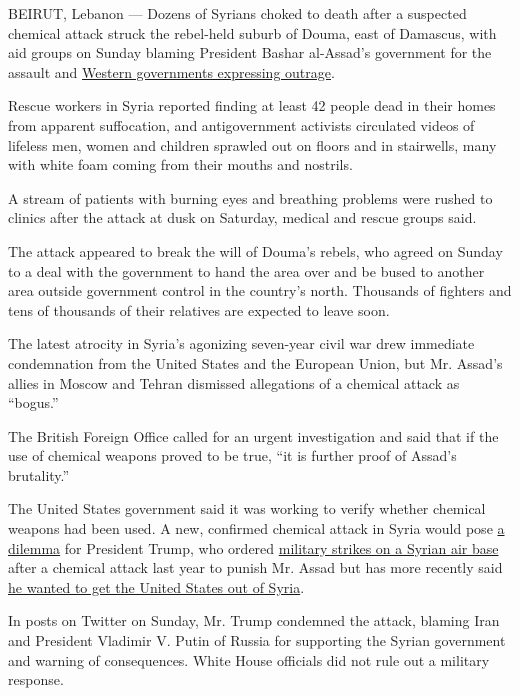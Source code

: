 BEIRUT, Lebanon --- Dozens of Syrians choked to death after a suspected
chemical attack struck the rebel-held suburb of Douma, east of Damascus,
with aid groups on Sunday blaming President Bashar al-Assad's government
for the assault and
\href{https://www.nytimes.com/2018/04/08/world/middleeast/syria-trump-assad.html}{Western
governments expressing outrage}.

Rescue workers in Syria reported finding at least 42 people dead in
their homes from apparent suffocation, and antigovernment activists
circulated videos of lifeless men, women and children sprawled out on
floors and in stairwells, many with white foam coming from their mouths
and nostrils.

A stream of patients with burning eyes and breathing problems were
rushed to clinics after the attack at dusk on Saturday, medical and
rescue groups said.

The attack appeared to break the will of Douma's rebels, who agreed on
Sunday to a deal with the government to hand the area over and be bused
to another area outside government control in the country's north.
Thousands of fighters and tens of thousands of their relatives are
expected to leave soon.

The latest atrocity in Syria's agonizing seven-year civil war drew
immediate condemnation from the United States and the European Union,
but Mr. Assad's allies in Moscow and Tehran dismissed allegations of a
chemical attack as ``bogus.''

The British Foreign Office called for an urgent investigation and said
that if the use of chemical weapons proved to be true, ``it is further
proof of Assad's brutality.''

The United States government said it was working to verify whether
chemical weapons had been used. A new, confirmed chemical attack in
Syria would pose
\href{https://www.nytimes.com/2018/04/08/world/middleeast/syria-trump-assad.html}{a
dilemma} for President Trump, who ordered
\href{https://www.nytimes.com/2017/04/06/world/middleeast/us-said-to-weigh-military-responses-to-syrian-chemical-attack.html}{military
strikes on a Syrian air base} after a chemical attack last year to
punish Mr. Assad but has more recently said
\href{https://www.nytimes.com/2018/04/04/world/middleeast/trump-syria-troops.html}{he
wanted to get the United States out of Syria}.

In posts on Twitter on Sunday, Mr. Trump condemned the attack, blaming
Iran and President Vladimir V. Putin of Russia for supporting the Syrian
government and warning of consequences. White House officials did not
rule out a military response.


